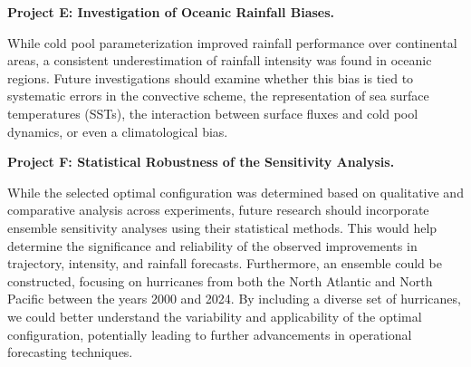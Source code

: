 \textbf{Project E: Investigation of Oceanic Rainfall Biases.}

While cold pool parameterization improved rainfall performance over continental areas, a consistent underestimation of rainfall intensity was found in oceanic regions. Future investigations should examine whether this bias is tied to systematic errors in the convective scheme, the representation of sea surface temperatures (SSTs), the interaction between surface fluxes and cold pool dynamics, or even a climatological bias.

\textbf{Project F: Statistical Robustness of the Sensitivity Analysis.}

While the selected optimal configuration was determined based on qualitative and comparative analysis across experiments, future research should incorporate ensemble sensitivity analyses using their statistical methods. This would help determine the significance and reliability of the observed improvements in trajectory, intensity, and rainfall forecasts. Furthermore, an ensemble could be constructed, focusing on hurricanes from both the North Atlantic and North Pacific between the years 2000 and 2024. By including a diverse set of hurricanes, we could better understand the variability and applicability of the optimal configuration, potentially leading to further advancements in operational forecasting techniques.

